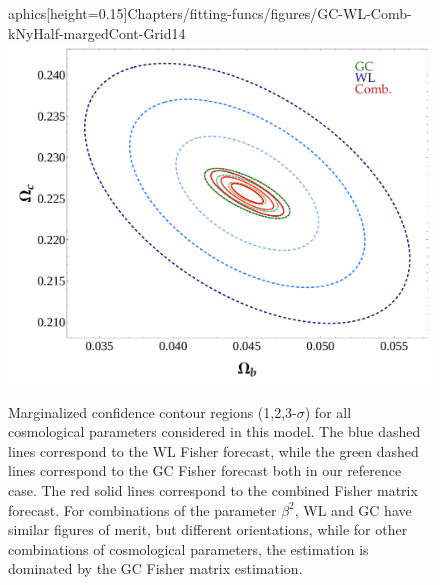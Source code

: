 \begin{figure}
\begin{centering}
aphics[height=0.15\paperheight]{Chapters/fitting-funcs/figures/GC-WL-Comb-kNyHalf-margedCont-Grid14}\hfill{}\includegraphics[height=0.15\paperheight]{Chapters/fitting-funcs/figures/GC-WL-Comb-kNyHalf-margedCont-Grid15} 
\par\end{centering}

\centering{}
\caption[Fisher confidence regions for GC and WL in the CDE model.]{\label{fig:Contour-regions} Marginalized confidence contour regions
(1,2,3-$\sigma$) for all cosmological parameters considered in this
model. The blue dashed lines correspond to the WL Fisher forecast,
while the green dashed lines correspond to the GC Fisher forecast
both in our reference case. The red solid lines correspond to the
combined Fisher matrix forecast. For combinations of the parameter
$\beta^{2}$, WL and GC have similar figures of merit, but different
orientations, while for other combinations of cosmological parameters,
the estimation is dominated by the GC Fisher matrix estimation.}
\end{figure}



